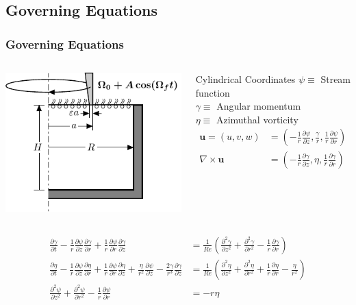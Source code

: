 \documentclass[compress]{beamer}
\begin{document}
\subsection{Governing Equations}
\begin{frame} \frametitle{Governing Equations}
\begin{columns}
\includegraphics[scale=.95]{scheme.pdf}
\pause
\vspace{-8mm}
{\footnotesize
\begin{block}{Cylindrical Coordinates}
$\psi\equiv$ Stream function\\
$\gamma\equiv$ Angular momentum\\
$\eta\equiv$ Azimuthal vorticity
\begin{align*}
\textbf{u} = (u,v,w) &= \left(-\frac{1}{r}\frac{\partial\psi}{\partial z},\frac{\gamma}{r},\frac{1}{r}\frac{\partial\psi}{\partial r}\right)\\
\nabla\times\textbf{u} &= \left(-\frac{1}{r}\frac{\partial\gamma}{\partial z},\eta,\frac{1}{r}\frac{\partial\gamma}{\partial r}\right)
\end{align*}
\vspace{-4mm}
\end{block}}
\end{columns}
\pause
{\small
\vspace{-5mm}
\begin{align*}
\frac{\partial\gamma}{\partial
t}-\frac{1}{r}\frac{\partial\psi}{\partial
z}\frac{\partial\gamma}{\partial
r}+\frac{1}{r}\frac{\partial\psi}{\partial
r}\frac{\partial\gamma}{\partial
z}&=\frac{1}{Re}\left(\frac{\partial^2\gamma}{\partial
z^2}+\frac{\partial^2\gamma}{\partial
r^2}-\frac{1}{r}\frac{\partial\gamma}{\partial
r}\right)\\
\frac{\partial \eta}{\partial t}-\frac{1}{r}\frac{\partial
\psi}{\partial z}\frac{\partial \eta}{\partial
r}+\frac{1}{r}\frac{\partial \psi}{\partial r}\frac{\partial
\eta}{\partial z}+\frac{\eta}{r^2}\frac{\partial \psi}{\partial
z}-\frac{2\gamma}{r^3}\frac{\partial \gamma}{\partial
z}&=\frac{1}{Re}\left(\frac{\partial^2\eta}{\partial
z^2}+\frac{\partial^2\eta}{\partial
r^2}+\frac{1}{r}\frac{\partial\eta}{\partial
r}-\frac{\eta}{r^2}\right)\\
\frac{\partial^2\psi}{\partial z^2}+\frac{\partial^2\psi}{\partial
r^2}-\frac{1}{r}\frac{\partial\psi}{\partial r}&=-r\eta
\end{align*}}
\end{frame}
\end{document}
